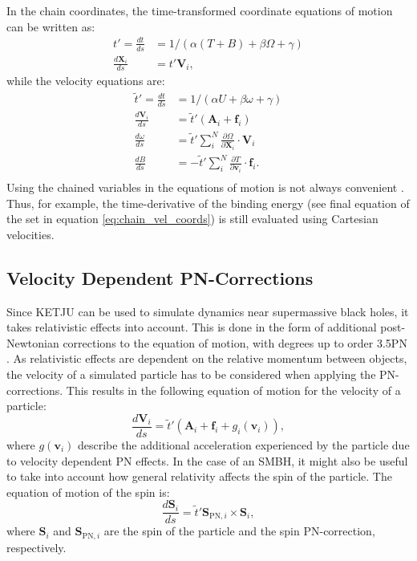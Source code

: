 \documentclass[english, twoside]{HYgradu}
\begin{document}
In the chain coordinates, the time-transformed coordinate equations of motion can be written as:
\begin{equation}
\begin{split}
t'= \frac{dt}{ds} &= 1/(\alpha(T+B) + \beta\Omega + \gamma) \\
\frac{d\mathbf{X}_i}{ds} &= t' \mathbf{V}_i,
\end{split}
\end{equation}
while the velocity equations are:
\begin{equation}
\begin{split}
\tilde{t}' = \frac{dt}{ds} &= 1/(\alpha U + \beta\omega + \gamma) \\
\frac{d\mathbf{V}_i}{ds} &= \tilde{t}' (\mathbf{A}_i + \mathbf{f}_i) \\
\frac{d\omega}{ds} &= \tilde{t}' \displaystyle\sum^N_i \frac{\partial \Omega}{\partial \mathbf{X}_i} \cdot \mathbf{V}_i \\
\frac{dB}{ds} &= -\tilde{t}' \displaystyle\sum^N_i \frac{\partial T}{\partial \mathbf{v}_i} \cdot \mathbf{f}_i. \\
\end{split} \label{eq:chain_vel_coords}
\end{equation}
Using the chained variables in the equations of motion is not always convenient \citep{Mikkola2008ARCHAIN}. Thus, for example, the time-derivative of the binding energy (see final equation of the set in equation \ref{eq:chain_vel_coords}) is still evaluated using Cartesian velocities.

\subsection{Velocity Dependent PN-Corrections}

Since KETJU can be used to simulate dynamics near supermassive black holes, it takes relativistic effects into account. This is done in the form of additional post-Newtonian corrections to the equation of motion, with degrees up to order 3.5PN  \citep{Rantala2017KETJU}. As relativistic effects are dependent on the relative momentum between objects, the velocity of a simulated particle has to be considered when applying the PN-corrections. This results in the following equation of motion for the velocity of a particle:
\begin{equation}
\frac{d\mathbf{V}_i}{ds} = \tilde{t}' (\mathbf{A}_i + \mathbf{f}_i + g_i(\mathbf{v}_i)), \label{eq:velocity_eom_pn}
\end{equation}
where $g(\mathbf{v}_i)$ describe the additional acceleration experienced by the particle due to velocity dependent PN effects. In the case of an SMBH, it might also be useful to take into account how general relativity affects the spin of the particle. The equation of motion of the spin is: 
\begin{equation}
\frac{d\mathbf{S}_i}{ds} = \tilde{t}' \mathbf{S}_{\mathrm{PN},i} \times \mathbf{S}_i, \label{eq:spin_eom_pn}
\end{equation}
where $\mathbf{S}_i$ and $\mathbf{S}_{\mathrm{PN},i}$ are the spin of the particle and the spin PN-correction, respectively.
\end{document}
